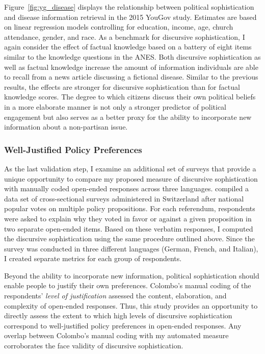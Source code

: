 Figure~\ref{fig:yg_disease} displays the relationship between political sophistication and disease information retrieval in the 2015 YouGov study. Estimates are based on linear regression models controlling for education, income, age, church attendance, gender, and race. As a benchmark for discursive sophistication, I again consider the effect of factual knowledge based on a battery of eight items similar to the knowledge questions in the ANES. Both discursive sophistication as well as factual knowledge increase the amount of information individuals are able to recall from a news article discussing a fictional disease. Similar to the previous results, the effects are stronger for discursive sophistication than for factual knowledge scores. The degree to which citizens discuss their own political beliefs in a more elaborate manner is not only a stronger predictor of political engagement but also serves as a better proxy for the ability to incorporate new information about a non-partisan issue.


\subsubsection*{Well-Justified Policy Preferences}
As the last validation step, I examine an additional set of surveys that provide a unique opportunity to compare my proposed measure of discursive sophistication with manually coded open-ended responses across three languages.  \citet{colombo2016justifications} compiled a data set of cross-sectional surveys administered in Switzerland after national popular votes on multiple policy propositions. For each referendum, respondents were asked to explain why they voted in favor or against a given proposition in two separate open-ended items. Based on these verbatim responses, I computed the discursive sophistication using the same procedure outlined above. Since the survey was conducted in three different languages (German, French, and Italian), I created separate metrics for each group of respondents.

Beyond the ability to incorporate new information, political sophistication should enable people to justify their own preferences. Colombo's \citeyearpar{colombo2016justifications} manual coding of the respondents' \textit{level of justification} assessed the content, elaboration, and complexity of open-ended responses. Thus, this study provides an opportunity to directly assess the extent to which high levels of discursive sophistication correspond to well-justified policy preferences in open-ended responses. Any overlap between Colombo's \citeyearpar{colombo2016justifications} manual coding with my automated measure corroborates the face validity of discursive sophistication.

